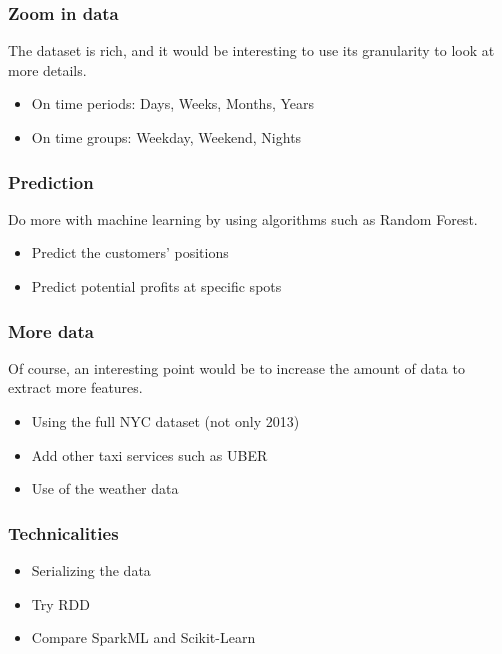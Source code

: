 \documentclass[a4paper]{article}
\begin{document}
\subsubsection{Zoom in data}
The dataset is rich, and it would be interesting to use its granularity to look at more details.
\begin{itemize}
    \item On time periods: Days, Weeks, Months, Years
    \item On time groups: Weekday, Weekend, Nights
\end{itemize}

\subsubsection{Prediction}
Do more with machine learning by using algorithms such as Random Forest.
\begin{itemize}
    \item Predict the customers' positions
    \item Predict potential profits at specific spots
\end{itemize}

\subsubsection{More data}
Of course, an interesting point would be to increase the amount of data to extract more features.
\begin{itemize}
    \item Using the full NYC dataset (not only 2013)
    \item Add other taxi services such as UBER
    \item Use of the weather data
\end{itemize}

\subsubsection{Technicalities}
\begin{itemize}
    \item Serializing the data
    \item Try RDD
    \item Compare SparkML and Scikit-Learn
\end{itemize}
\end{document}
